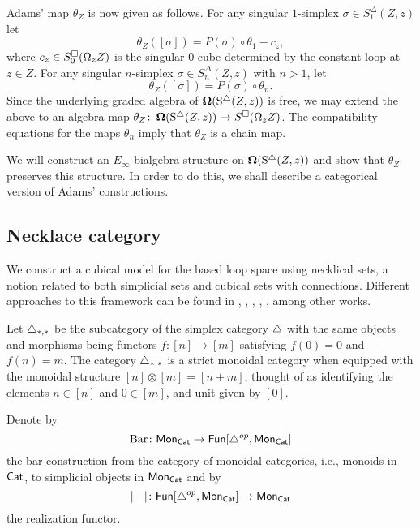 Adams' map $\theta_Z$ is now given as follows.
For any singular $1$-simplex $\sigma \in S^{\Delta}_1(Z, z)$ let
$$\theta_Z([\sigma])= P(\sigma) \circ \theta_1 - c_z,$$
where $c_z \in S^{\square}_0(\Omega_z Z)$ is the singular $0$-cube determined by the constant loop at $z \in Z.$ For any singular $n$-simplex $\sigma \in S^{\Delta}_n(Z, z)$ with $n>1$, let
$$\theta_Z([\sigma])= P(\sigma) \circ \theta_n.$$ Since the underlying graded algebra of $\operatorname{\mathbf{\Omega}}(\operatorname{S^{\triangle}}(Z, z))$ is free, we may extend the above to an algebra map $\theta_Z \colon \operatorname{\mathbf{\Omega}}(\operatorname{S^{\triangle}}(Z, z)) \to S^{\square}(\Omega_z Z)$.
The compatibility equations for the maps $\theta_n$ imply that $\theta_Z$ is a chain map.

We will construct an $E_{\infty}$-bialgebra structure on $\operatorname{\mathbf{\Omega}}(\operatorname{S^{\triangle}}(Z, z))$ and show that $\theta_Z$ preserves this structure.
In order to do this, we shall describe a categorical version of Adams' constructions.

\subsection{Necklace category}

We construct a cubical model for the based loop space using necklical sets, a notion related to both simplicial sets and cubical sets with connections.
Different approaches to this framework can be found in \cite{baues1998hopf}, \cite{galvez2020hopf}, \cite{dugger2011rigidification}, \cite{rivera2018cubical}, \cite{rivera2019path}, among other works.

Let $\triangle_{*,*}$ be the subcategory of the simplex category $\triangle$ with the same objects and morphisms being functors $f \colon [n] \to [m]$ satisfying $f(0) = 0$ and $f(n) = m$.
The category $\triangle_{*,*}$ is a strict monoidal category when equipped with the monoidal structure $[n] \otimes [m] = [n+m]$, thought of as identifying the elements $n \in [n]$ and $0 \in [m]$, and unit given by $[0]$.

Denote by
\begin{equation*}
\operatorname{Bar} \colon \mathsf{Mon}_{\mathsf{Cat}} \to \mathsf{Fun}[\triangle^{op}, \mathsf{Mon}_{\mathsf{Cat}}]
\end{equation*}
the bar construction from the category of monoidal categories, i.e., monoids in $\mathsf{Cat}$, to simplicial objects in $\mathsf{Mon}_{\mathsf{Cat}}$ and by
\begin{equation*}
\vert{\ \cdot \ }\vert \colon \mathsf{Fun}[\triangle^{op}, \mathsf{Mon}_{\mathsf{Cat}}] \to \mathsf{Mon}_{\mathsf{Cat}}
\end{equation*}
the realization functor.

